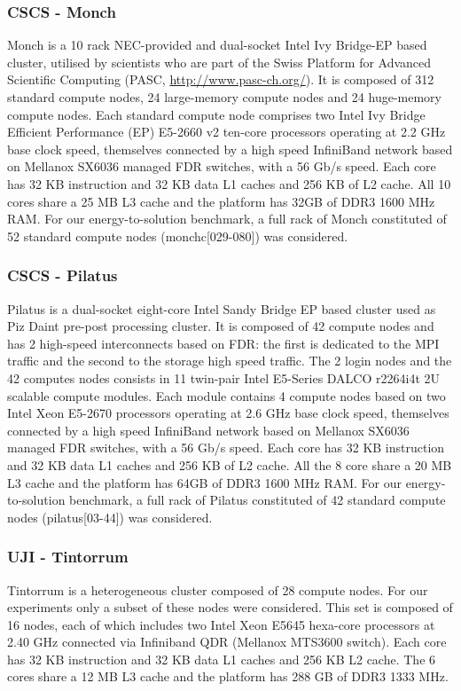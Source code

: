 \subsubsection{CSCS - Monch}
Monch is  a 10 rack  NEC-provided and dual-socket Intel  Ivy Bridge-EP
based  cluster, utilised  by  scientists  who are  part  of the  Swiss
Platform     for      Advanced     Scientific     Computing     (PASC,
\url{http://www.pasc-ch.org/}). It is composed of 312 standard compute
nodes, 24 large-memory compute nodes and 24 huge-memory compute nodes.
Each standard  compute node comprises  two Intel Ivy  Bridge Efficient
Performance (EP)  E5-2660 v2 ten-core processors operating  at 2.2 GHz
base  clock speed,  themselves connected  by a  high  speed InfiniBand
network based on Mellanox SX6036  managed FDR switches, with a 56 Gb/s
speed.  Each core  has 32 KB instruction and 32 KB  data L1 caches and
256  KB of L2  cache. All  10 cores  share a  25 MB  L3 cache  and the
platform has  32GB of  DDR3 1600 MHz  RAM. For  our energy-to-solution
benchmark, a  full rack  of Monch constituted  of 52  standard compute
nodes (monchc[029-080]) was considered.

\subsubsection{CSCS - Pilatus}
Pilatus  is  a dual-socket  eight-core  Intel  Sandy  Bridge EP  based
cluster used as Piz Daint pre-post processing cluster.  It is composed
of 42 compute  nodes and has 2 high-speed  interconnects based on FDR:
the  first is  dedicated to  the  MPI traffic  and the  second to  the
storage high  speed traffic.   The 2 login  nodes and the  42 computes
nodes  consists in  11  twin-pair Intel  E5-Series  DALCO r2264i4t  2U
scalable compute modules.  Each  module contains 4 compute nodes based
on two Intel  Xeon E5-2670 processors operating at  2.6 GHz base clock
speed, themselves  connected by a high speed  InfiniBand network based
on Mellanox  SX6036 managed FDR switches,  with a 56  Gb/s speed. Each
core has 32 KB  instruction and 32 KB data L1 caches  and 256 KB of L2
cache.  All  the 8 core share  a 20 MB  L3 cache and the  platform has
64GB of  DDR3 1600 MHz  RAM.  For our energy-to-solution  benchmark, a
full  rack  of  Pilatus  constituted  of  42  standard  compute  nodes
(pilatus[03-44]) was considered.

\subsubsection{UJI - Tintorrum}
Tintorrum  is a heterogeneous  cluster composed  of 28  compute nodes.
For our experiments only a subset of these nodes were considered. This
set is  composed of 16  nodes, each of  which includes two  Intel Xeon
E5645 hexa-core  processors at 2.40  GHz connected via  Infiniband QDR
(Mellanox MTS3600 switch).  Each core  has 32 KB instruction and 32 KB
data L1 caches and 256 KB L2 cache. The 6 cores share a 12 MB L3 cache
and the platform has 288 GB of DDR3 1333 MHz.
 
